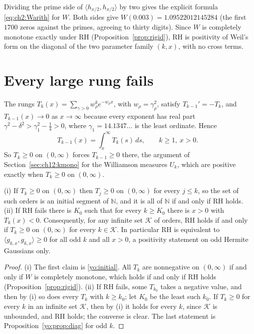 Dividing the prime side of $\langle h_{x/2},h_{x/2}\rangle$ by two gives the explicit formula \eqref{eq:ch2:Warith} for $W$. Both sides give $W(0.003)=1.09522012145284$ (the first $1700$ zeros against the primes, agreeing to thirty digits). Since $W$ is completely monotone exactly under RH (Proposition~\ref{prop:rigid}), RH is positivity of Weil's form on the diagonal of the two parameter family $(k,x)$, with no cross terms.

\section{Every large rung fails}\label{yo:sec:rungs}

The rungs $T_k(x)=\sum_{\gamma>0}w_\rho^ke^{-w_\rho x}$, with $w_\rho=\gamma_\rho^2$, satisfy $T_{k-1}'=-T_k$, and $T_{k-1}(x)\to0$ as $x\to\infty$ because every exponent has real part $\gamma^2-\delta^2>\gamma_1^2-\frac14>0$, where $\gamma_1=14.1347\ldots$ is the least ordinate. Hence
\begin{equation}\label{yo:initial}
T_{k-1}(x)=\int_x^\infty T_k(s)\,ds,\qquad k\ge1,\ x>0 .
\end{equation}
So $T_k\ge0$ on $(0,\infty)$ forces $T_{k-1}\ge0$ there, the argument of Section~\ref{sec:ch12:kmono} for the Williamson measures $U_k$, which are positive exactly when $T_k\ge0$ on $(0,\infty)$.

\begin{theorem}\label{yo:thm:rungs}
(i) If $T_k\ge0$ on $(0,\infty)$ then $T_j\ge0$ on $(0,\infty)$ for every $j\le k$, so the set of such orders is an initial segment of $\mathbb N$, and it is all of $\mathbb N$ if and only if RH holds. (ii) If RH fails there is $K_0$ such that for every $k\ge K_0$ there is $x>0$ with $T_k(x)<0$. Consequently, for any infinite set $\mathcal K$ of orders, RH holds if and only if $T_k\ge0$ on $(0,\infty)$ for every $k\in\mathcal K$. In particular RH is equivalent to $\langle g_{k,x},g_{k,x}\rangle\ge0$ for all odd $k$ and all $x>0$, a positivity statement on odd Hermite Gaussians only.
\end{theorem}

\begin{proof}
(i) The first claim is \eqref{yo:initial}. All $T_k$ are nonnegative on $(0,\infty)$ if and only if $W$ is completely monotone, which holds if and only if RH holds (Proposition~\ref{prop:rigid}). (ii) If RH fails, some $T_{k_0}$ takes a negative value, and then by (i) so does every $T_k$ with $k\ge k_0$; let $K_0$ be the least such $k_0$. If $T_k\ge0$ for every $k$ in an infinite set $\mathcal K$, then by (i) it holds for every $k$, since $\mathcal K$ is unbounded, and RH holds; the converse is clear. The last statement is Proposition~\ref{yo:prop:diag} for odd $k$.
\end{proof}

